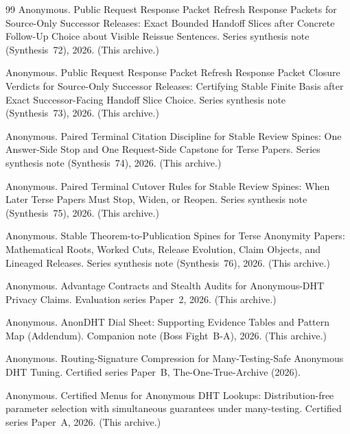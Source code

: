 \documentclass[11pt]{article}
\begin{document}
\begin{thebibliography}{99}
Anonymous.
\newblock Public Request Response Packet Refresh Response Packets for Source-Only Successor Releases: Exact Bounded Handoff Slices after Concrete Follow-Up Choice about Visible Reissue Sentences.
\newblock Series synthesis note (Synthesis~72), 2026. (This archive.)

Anonymous.
\newblock Public Request Response Packet Refresh Response Packet Closure Verdicts for Source-Only Successor Releases: Certifying Stable Finite Basis after Exact Successor-Facing Handoff Slice Choice.
\newblock Series synthesis note (Synthesis~73), 2026. (This archive.)

Anonymous.
\newblock Paired Terminal Citation Discipline for Stable Review Spines: One Answer-Side Stop and One Request-Side Capstone for Terse Papers.
\newblock Series synthesis note (Synthesis~74), 2026. (This archive.)

Anonymous.
\newblock Paired Terminal Cutover Rules for Stable Review Spines: When Later Terse Papers Must Stop, Widen, or Reopen.
\newblock Series synthesis note (Synthesis~75), 2026. (This archive.)

Anonymous.
\newblock Stable Theorem-to-Publication Spines for Terse Anonymity Papers: Mathematical Roots, Worked Cuts, Release Evolution, Claim Objects, and Lineaged Releases.
\newblock Series synthesis note (Synthesis~76), 2026. (This archive.)




Anonymous.
\newblock Advantage Contracts and Stealth Audits for Anonymous-DHT Privacy Claims.
\newblock Evaluation series Paper~2, 2026. (This archive.)

Anonymous.
\newblock AnonDHT Dial Sheet: Supporting Evidence Tables and Pattern Map (Addendum).
\newblock Companion note (Boss Fight~B-A), 2026. (This archive.)

Anonymous.
\newblock Routing-Signature Compression for Many-Testing-Safe Anonymous DHT Tuning.
\newblock Certified series Paper~B, The-One-True-Archive (2026).

Anonymous.
\newblock Certified Menus for Anonymous DHT Lookups: Distribution-free parameter selection with simultaneous guarantees under many-testing.
\newblock Certified series Paper~A, 2026. (This archive.)


\end{thebibliography}
\end{document}
